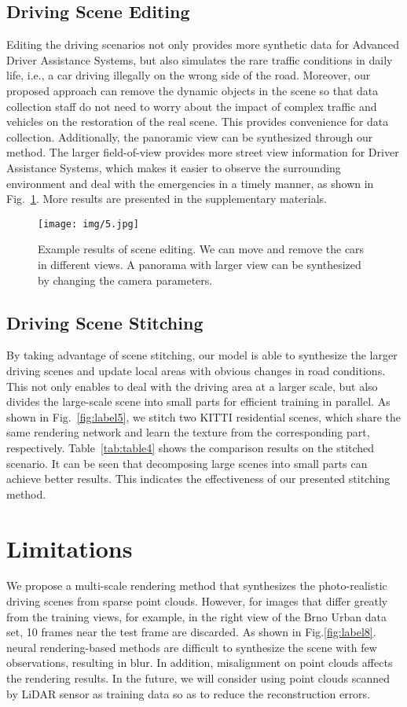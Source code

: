 \documentclass[sigconf]{acmart}
\begin{document}
\subsection{Driving Scene Editing}
Editing the driving scenarios not only provides more synthetic data for Advanced Driver Assistance Systems, but also simulates the rare traffic conditions in daily life, i.e., a car driving illegally on the wrong side of the road. Moreover, our proposed approach can remove the dynamic objects in the scene so that data collection staff do not need to worry about the impact of complex traffic and vehicles on the restoration of the real scene. This provides convenience for data collection. Additionally, the panoramic view can be synthesized through our method. The larger field-of-view provides more street view information for Driver Assistance Systems, which makes it easier to observe the surrounding environment and deal with the emergencies in a timely manner, as shown in Fig.~\ref{fig:label7}. More results are presented in the supplementary materials.

\begin{figure}[h]
  \centering
  \texttt{[image: img/5.jpg]}
  \caption{Example results of scene editing. We can move and remove the cars in different views. A panorama with larger view can be synthesized by changing the camera parameters.}
\label{fig:label7}
\end{figure}
\subsection{Driving Scene Stitching}
By taking advantage of scene stitching, our model is able to synthesize the larger driving scenes and update local areas with obvious changes in road conditions. This not only enables to deal with the driving area at a larger scale, but also divides the large-scale scene into small parts for efficient training in parallel. As shown in Fig.~\ref{fig:label5}, we stitch two KITTI residential scenes, which share the same rendering network and learn the texture from the corresponding part, respectively. Table~\ref{tab:table4} shows the comparison results on the stitched scenario. It can be seen that decomposing large scenes into small parts can achieve better results. This indicates the effectiveness of our presented stitching method.
 


\section{Limitations}
We propose a multi-scale rendering method that synthesizes the photo-realistic driving scenes from sparse point clouds. However, for images that differ greatly from the training views, for example, in the right view of the Brno Urban data set, 10 frames near the test frame are discarded. As shown in Fig.\ref{fig:label8}. neural rendering-based methods are difficult to synthesize the scene with few observations, resulting in blur. In addition, misalignment on point clouds affects the rendering results. In the future, we will consider using point clouds scanned by LiDAR sensor as training data so as to reduce the reconstruction errors.
\end{document}
